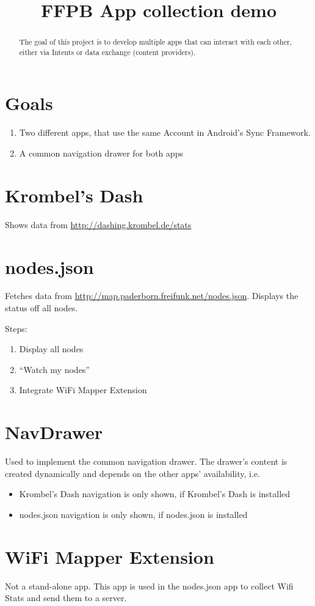 \documentclass[10pt,a4paper]{article}
\title{FFPB App collection demo}
\newcommand{\krombel}{Krombel's Dash }
\newcommand{\nodes}{nodes.json }
\newcommand{\wifiMapper}{WiFi Mapper Extension }
\begin{document}
\maketitle

\begin{abstract}
 The goal of this project is to develop multiple apps that can interact with each other, either via Intents or data exchange (content providers). 
\end{abstract}


\section{Goals}
\begin{enumerate}
 \item Two different apps, that use the same Account in Android's Sync Framework.
 \item A common navigation drawer for both apps
\end{enumerate} 

\section{\krombel} Shows data from \url{http://dashing.krombel.de/stats}
\section{\nodes}
Fetches data from \url{http://map.paderborn.freifunk.net/nodes.json}. Displays the status off all nodes.

Steps:
\begin{enumerate}
 \item Display all nodes
 \item ``Watch my nodes''
 \item Integrate \wifiMapper
\end{enumerate}


\section{NavDrawer}
 Used to implement the common navigation drawer. The drawer's content is created dynamically and depends on the other apps' availability, i.e.
\begin{itemize}
 \item \krombel navigation is only shown, if \krombel is installed
 \item \nodes navigation is only shown, if \nodes is installed
\end{itemize}

\section{\wifiMapper}
Not a stand-alone app. This app is used in the \nodes app to collect Wifi Stats and send them to a server. 
\end{document}
